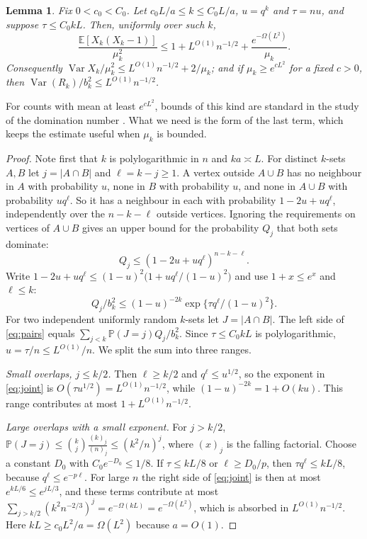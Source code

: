 \documentclass[11pt]{article}
\newtheorem{lemma}[theorem]{Lemma}
\theoremstyle{remark}
\newcommand{\E}{\mathbb E}
\newcommand{\PP}{\mathbb P}
\newcommand{\Var}{\operatorname{Var}}
\begin{document}
\begin{lemma}\label{lem:pairs}
Fix $0<c_0<C_0$. Let $c_0L/a\le k\le C_0L/a$, $u=q^k$ and $\tau=nu$, and suppose $\tau\le C_0kL$. Then, uniformly over such $k$,
\begin{equation}
 \frac{\E[X_k(X_k-1)]}{\mu_k^2}
 \le 1+L^{O(1)}n^{-1/2}+\frac{e^{-\Omega(L^2)}}{\mu_k}.
 \label{eq:pairs}
\end{equation}
Consequently $\Var X_k/\mu_k^2\le L^{O(1)}n^{-1/2}+2/\mu_k$; and if $\mu_k\ge e^{cL^2}$ for a fixed $c>0$, then $\Var(R_k)/b_k^2\le L^{O(1)}n^{-1/2}$.
\end{lemma}
For counts with mean at least $e^{cL^2}$, bounds of this kind are standard in the study of the domination number \cite{WG,GLS,MPP}. What we need is the form of the last term, which keeps the estimate useful when $\mu_k$ is bounded.
\begin{proof}
Note first that $k$ is polylogarithmic in $n$ and $ka\asymp L$. For distinct $k$-sets $A,B$ let $j=|A\cap B|$ and $\ell=k-j\ge1$. A vertex outside $A\cup B$ has no neighbour in $A$ with probability $u$, none in $B$ with probability $u$, and none in $A\cup B$ with probability $uq^\ell$. So it has a neighbour in each with probability $1-2u+uq^\ell$, independently over the $n-k-\ell$ outside vertices. Ignoring the requirements on vertices of $A\cup B$ gives an upper bound for the probability $Q_j$ that both sets dominate:
\[
 Q_j\le(1-2u+uq^\ell)^{n-k-\ell}.
\]
Write $1-2u+uq^\ell\le(1-u)^2\big(1+uq^\ell/(1-u)^2\big)$ and use $1+x\le e^x$ and $\ell\le k$:
\begin{equation}
 Q_j/b_k^2 \le (1-u)^{-2k}\exp\{\tau q^\ell/(1-u)^2\}.
 \label{eq:joint}
\end{equation}
For two independent uniformly random $k$-sets let $J=|A\cap B|$. The left side of \eqref{eq:pairs} equals $\sum_{j<k}\PP(J=j)Q_j/b_k^2$. Since $\tau\le C_0kL$ is polylogarithmic, $u=\tau/n\le L^{O(1)}/n$. We split the sum into three ranges.

\emph{Small overlaps, $j\le k/2$.} Then $\ell\ge k/2$ and $q^\ell\le u^{1/2}$, so the exponent in \eqref{eq:joint} is $O(\tau u^{1/2})=L^{O(1)}n^{-1/2}$, while $(1-u)^{-2k}=1+O(ku)$. This range contributes at most $1+L^{O(1)}n^{-1/2}$.

\emph{Large overlaps with a small exponent.} For $j>k/2$, $\PP(J=j)\le\binom kj\frac{(k)_j}{(n)_j}\le(k^2/n)^j$, where $(x)_j$ is the falling factorial. Choose a constant $D_0$ with $C_0e^{-D_0}\le1/8$. If $\tau\le kL/8$ or $\ell\ge D_0/p$, then $\tau q^\ell\le kL/8$, because $q^\ell\le e^{-p\ell}$. For large $n$ the right side of \eqref{eq:joint} is then at most $e^{kL/6}\le e^{jL/3}$, and these terms contribute at most $\sum_{j>k/2}(k^2n^{-2/3})^j=e^{-\Omega(kL)}=e^{-\Omega(L^2)}$, which is absorbed in $L^{O(1)}n^{-1/2}$. Here $kL\ge c_0L^2/a=\Omega(L^2)$ because $a=O(1)$.


\end{proof}
\end{document}
